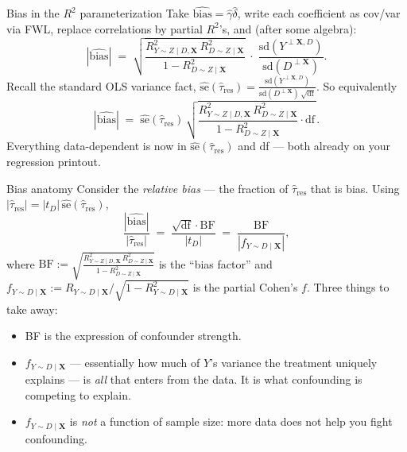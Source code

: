 \documentclass[xcolor=dvipsnames]{beamer}
\newcommand\X{{\bm X}}
\begin{document}
\begin{frame}{Bias in the $R^2$ parameterization}
\small
{} Take $\widehat{\text{bias}} = \hat{\gamma}\hat{\delta}$, write each coefficient as cov/var via FWL, replace correlations by partial $R^2$'s, and (after some algebra):
\[
\boxed{\;|\widehat{\text{bias}}| \;=\; \sqrt{\frac{R^2_{Y\sim Z \mid D, \X}\, R^2_{D\sim Z \mid \X}}{1 - R^2_{D\sim Z \mid \X}}}\;\cdot\; \frac{\text{sd}(Y^{\perp \X, D})}{\text{sd}(D^{\perp \X})}.\;}
\]
\medskip
{} Recall the standard OLS variance fact, $\widehat{\text{se}}(\hat{\tau}_{\text{res}}) = \frac{\text{sd}(Y^{\perp \X, D})}{\text{sd}(D^{\perp \X})\,\sqrt{\text{df}}}$.  So equivalently
\[
|\widehat{\text{bias}}| \;=\; \widehat{\text{se}}(\hat{\tau}_{\text{res}})\,\sqrt{\frac{R^2_{Y\sim Z \mid D, \X}\, R^2_{D\sim Z \mid \X}}{1 - R^2_{D\sim Z \mid \X}}\cdot \text{df}\,}.
\]
 Everything data-dependent is now in $\widehat{\text{se}}(\hat{\tau}_{\text{res}})$ and df --- both already on your regression printout.
\end{frame}


\begin{frame}{Bias anatomy}
\small
{} Consider the \emph{relative bias} --- the fraction of $\hat{\tau}_{\text{res}}$ that is bias. Using $|\hat{\tau}_{\text{res}}| = |t_D|\,\widehat{\text{se}}(\hat{\tau}_{\text{res}})$,
\[
\frac{|\widehat{\text{bias}}|}{|\hat{\tau}_{\text{res}}|}
\;=\; \frac{\sqrt{\text{df}}\cdot \text{BF}}{|t_D|}
\;=\; \frac{\text{BF}}{|f_{Y\sim D \mid \X}|},
\]
where $\text{BF} := \sqrt{\frac{R^2_{Y\sim Z \mid D,\X}\, R^2_{D\sim Z \mid \X}}{1-R^2_{D\sim Z \mid \X}}}$ is the ``bias factor'' and $f_{Y\sim D \mid \X} := R_{Y\sim D \mid \X}/\sqrt{1 - R^2_{Y\sim D \mid \X}}$ is the partial Cohen's $f$.
\medskip
{} Three things to take away:
\begin{itemize}
\item BF is the expression of confounder strength.
\item $f_{Y\sim D \mid \X}$ --- essentially how much of $Y$'s variance the treatment uniquely explains --- is \emph{all} that enters from the data. It is what confounding is competing to explain.
\item $f_{Y\sim D \mid \X}$ is \emph{not} a function of sample size: more data does not help you fight confounding.
\end{itemize}
\end{frame}
\end{document}
